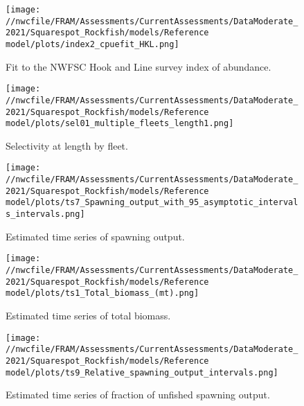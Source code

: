 \documentclass[11pt,
  english,
  a4paper,
]{article}
\begin{document}
\begin{figure}
\centering
\texttt{[image: //nwcfile/FRAM/Assessments/CurrentAssessments/DataModerate\_2021/Squarespot\_Rockfish/models/Reference model/plots/index2\_cpuefit\_HKL.png]}
\caption{Fit to the NWFSC Hook and Line survey index of abundance.\label{fig:hkl-index-fit}}
\end{figure}

\tagmcend\tagstructend


\begin{figure}
\centering
\texttt{[image: //nwcfile/FRAM/Assessments/CurrentAssessments/DataModerate\_2021/Squarespot\_Rockfish/models/Reference model/plots/sel01\_multiple\_fleets\_length1.png]}
\caption{Selectivity at length by fleet.\label{fig:selex}}
\end{figure}

\tagmcend\tagstructend


\begin{figure}
\centering
\texttt{[image: //nwcfile/FRAM/Assessments/CurrentAssessments/DataModerate\_2021/Squarespot\_Rockfish/models/Reference model/plots/ts7\_Spawning\_output\_with\_95\_asymptotic\_intervals\_intervals.png]}
\caption{Estimated time series of spawning output.\label{fig:ssb}}
\end{figure}

\tagmcend\tagstructend


\begin{figure}
\centering
\texttt{[image: //nwcfile/FRAM/Assessments/CurrentAssessments/DataModerate\_2021/Squarespot\_Rockfish/models/Reference model/plots/ts1\_Total\_biomass\_(mt).png]}
\caption{Estimated time series of total biomass.\label{fig:tot-bio}}
\end{figure}

\tagmcend\tagstructend


\begin{figure}
\centering
\texttt{[image: //nwcfile/FRAM/Assessments/CurrentAssessments/DataModerate\_2021/Squarespot\_Rockfish/models/Reference model/plots/ts9\_Relative\_spawning\_output\_intervals.png]}
\caption{Estimated time series of fraction of unfished spawning output.\label{fig:depl}}
\end{figure}
\end{document}
